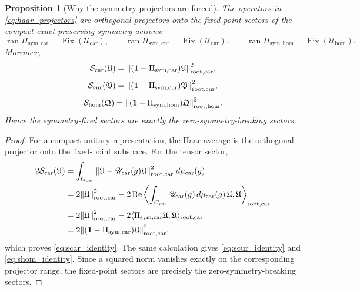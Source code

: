 \documentclass[11pt]{article}
\newcommand{\RootTensor}{\mathfrak U}
\newcommand{\RootRelabel}{\mathfrak V}
\newcommand{\RootFree}{\mathfrak Q}
\newcommand{\TensorSymProj}{\Pi_{\mathrm{sym,car}}}
\newcommand{\CurSymProj}{\Pi_{\mathrm{sym,cur}}}
\newcommand{\HomSymProj}{\Pi_{\mathrm{sym,hom}}}
\newcommand{\TensorSymAct}{\mathscr U_{\mathrm{car}}}
\newcommand{\CurSymAct}{\mathscr U_{\mathrm{cur}}}
\newcommand{\HomSymAct}{\mathscr U_{\mathrm{hom}}}
\newcommand{\Fix}{\operatorname{Fix}}
\newtheorem{proposition}{Proposition}
\begin{document}
\begin{proposition}[Why the symmetry projectors are forced]
\label{prop:symmetry_forced}
The operators in \eqref{eq:haar_projectors} are orthogonal projectors onto the fixed-point sectors of the compact exact-preserving symmetry actions:
\[
\operatorname{ran}\TensorSymProj=\Fix(\TensorSymAct),\qquad
\operatorname{ran}\CurSymProj=\Fix(\CurSymAct),\qquad
\operatorname{ran}\HomSymProj=\Fix(\HomSymAct).
\]
Moreover,
\begin{equation}
\mathcal S_{\mathrm{car}}(\RootTensor)
=
\norm{(\mathbf 1-\TensorSymProj)\RootTensor}_{\mathrm{root,car}}^2,
\label{eq:scar_identity}
\end{equation}
\begin{equation}
\mathcal S_{\mathrm{cur}}(\RootRelabel)
=
\norm{(\mathbf 1-\CurSymProj)\RootRelabel}_{\mathrm{root,cur}}^2,
\label{eq:scur_identity}
\end{equation}
\begin{equation}
\mathcal S_{\mathrm{hom}}(\RootFree)
=
\norm{(\mathbf 1-\HomSymProj)\RootFree}_{\mathrm{root,hom}}^2.
\label{eq:shom_identity}
\end{equation}
Hence the symmetry-fixed sectors are exactly the zero-symmetry-breaking sectors.
\end{proposition}

\begin{proof}
For a compact unitary representation, the Haar average is the orthogonal projector onto the fixed-point subspace. For the tensor sector,
\[
\begin{aligned}
2\mathcal S_{\mathrm{car}}(\RootTensor)
&=
\int_{G_{\mathrm{car}}}
\norm{\RootTensor-\TensorSymAct(g)\RootTensor}_{\mathrm{root,car}}^2
\;d\mu_{\mathrm{car}}(g)
\\
&=
2\norm{\RootTensor}_{\mathrm{root,car}}^2
-2\Re\left\langle
\int_{G_{\mathrm{car}}}\TensorSymAct(g)\,d\mu_{\mathrm{car}}(g)\,\RootTensor,
\RootTensor
\right\rangle_{\mathrm{root,car}}
\\
&=
2\norm{\RootTensor}_{\mathrm{root,car}}^2
-2\langle \TensorSymProj\RootTensor,\RootTensor\rangle_{\mathrm{root,car}}
\\
&=
2\norm{(\mathbf 1-\TensorSymProj)\RootTensor}_{\mathrm{root,car}}^2,
\end{aligned}
\]
which proves \eqref{eq:scar_identity}. The same calculation gives \eqref{eq:scur_identity} and \eqref{eq:shom_identity}. Since a squared norm vanishes exactly on the corresponding projector range, the fixed-point sectors are precisely the zero-symmetry-breaking sectors.
\end{proof}
\end{document}
